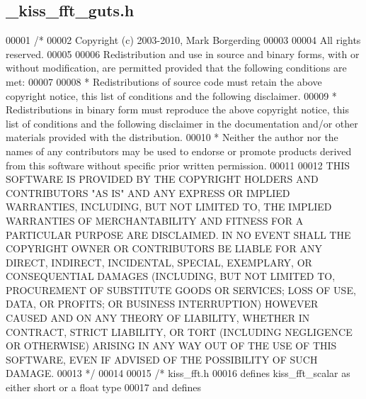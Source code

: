 \subsection{\+\_\+kiss\+\_\+fft\+\_\+guts.\+h}
\label{__kiss__fft__guts_8h_source}

\begin{DoxyCode}
00001 \textcolor{comment}{/*}
00002 \textcolor{comment}{Copyright (c) 2003-2010, Mark Borgerding}
00003 \textcolor{comment}{}
00004 \textcolor{comment}{All rights reserved.}
00005 \textcolor{comment}{}
00006 \textcolor{comment}{Redistribution and use in source and binary forms, with or without modification, are permitted provided
       that the following conditions are met:}
00007 \textcolor{comment}{}
00008 \textcolor{comment}{    * Redistributions of source code must retain the above copyright notice, this list of conditions and
       the following disclaimer.}
00009 \textcolor{comment}{    * Redistributions in binary form must reproduce the above copyright notice, this list of conditions and
       the following disclaimer in the documentation and/or other materials provided with the distribution.}
00010 \textcolor{comment}{    * Neither the author nor the names of any contributors may be used to endorse or promote products
       derived from this software without specific prior written permission.}
00011 \textcolor{comment}{}
00012 \textcolor{comment}{THIS SOFTWARE IS PROVIDED BY THE COPYRIGHT HOLDERS AND CONTRIBUTORS "AS IS" AND ANY EXPRESS OR IMPLIED
       WARRANTIES, INCLUDING, BUT NOT LIMITED TO, THE IMPLIED WARRANTIES OF MERCHANTABILITY AND FITNESS FOR A
       PARTICULAR PURPOSE ARE DISCLAIMED. IN NO EVENT SHALL THE COPYRIGHT OWNER OR CONTRIBUTORS BE LIABLE FOR ANY DIRECT,
       INDIRECT, INCIDENTAL, SPECIAL, EXEMPLARY, OR CONSEQUENTIAL DAMAGES (INCLUDING, BUT NOT LIMITED TO, PROCUREMENT
       OF SUBSTITUTE GOODS OR SERVICES; LOSS OF USE, DATA, OR PROFITS; OR BUSINESS INTERRUPTION) HOWEVER CAUSED
       AND ON ANY THEORY OF LIABILITY, WHETHER IN CONTRACT, STRICT LIABILITY, OR TORT (INCLUDING NEGLIGENCE OR
       OTHERWISE) ARISING IN ANY WAY OUT OF THE USE OF THIS SOFTWARE, EVEN IF ADVISED OF THE POSSIBILITY OF SUCH DAMAGE.}
00013 \textcolor{comment}{*/}
00014 
00015 \textcolor{comment}{/* kiss\_fft.h}
00016 \textcolor{comment}{   defines kiss\_fft\_scalar as either short or a float type}
00017 \textcolor{comment}{   and defines}

\end{DoxyCode}
